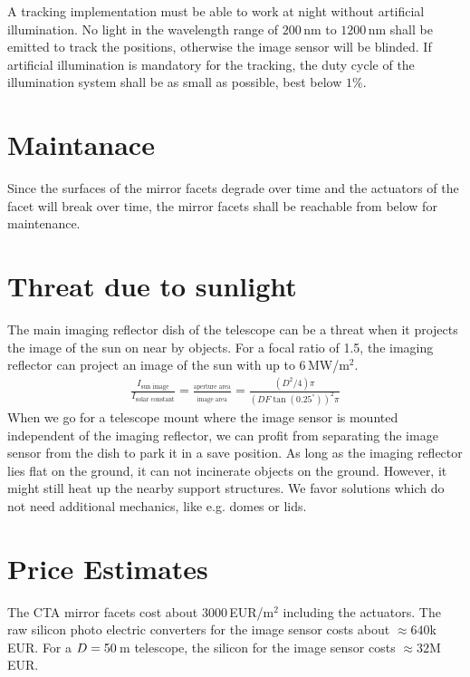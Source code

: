 \documentclass[11pt,a4paper,oneside,titlepage]{article}
\begin{document}
%
A tracking implementation must be able to work at night without artificial illumination.
%
No light in the wavelength range of $200\,$nm to $1200\,$nm shall be emitted to track the positions, otherwise the image sensor will be blinded.
%
If artificial illumination is mandatory for the tracking, the duty cycle of the illumination system shall be as small as possible, best below $1\%$. 
\section{Maintanace}
%
Since the surfaces of the mirror facets degrade over time and the actuators of the facet will break over time, the mirror facets shall be reachable from below for maintenance.
\section{Threat due to sunlight}
%
The main imaging reflector dish of the telescope can be a threat when it projects the image of the sun on near by objects.
%
For a focal ratio of 1.5, the imaging reflector can project an image of the sun with up to $6\,$MW/m$^2$.
%
\begin{eqnarray}
\frac{I_\text{sun image}}{I_\text{solar constant}} = \frac{_\text{aperture area}}{_\text{image area}} = \frac{(D^2/4) \pi}{(D F \tan(0.25^\circ))^2 \pi} 
\end{eqnarray}
%
When we go for a telescope mount where the image sensor is mounted independent of the imaging reflector, we can profit from separating the image sensor from the dish to park it in a save position.
%
As long as the imaging reflector lies flat on the ground, it can not incinerate objects on the ground.
%
However, it might still heat up the nearby support structures.
%
We favor solutions which do not need additional mechanics, like e.g. domes or lids.
\section{Price Estimates}
%
The CTA mirror facets cost about 3000\,EUR/m$^2$ including the actuators.
%
The raw silicon photo electric converters for the image sensor costs about $\approx 640$k\,EUR.
%  
For a $D = 50\,$m telescope, the silicon for the image sensor costs $\approx 32$M\,EUR.
\end{document}
